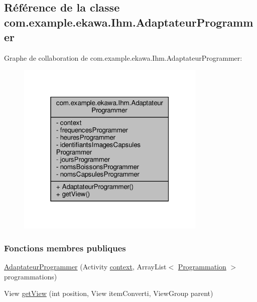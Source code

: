 \hypertarget{classcom_1_1example_1_1ekawa_1_1_ihm_1_1_adaptateur_programmer}{}\subsection{Référence de la classe com.\+example.\+ekawa.\+Ihm.\+Adaptateur\+Programmer}
\label{classcom_1_1example_1_1ekawa_1_1_ihm_1_1_adaptateur_programmer}


Graphe de collaboration de com.\+example.\+ekawa.\+Ihm.\+Adaptateur\+Programmer\+:\nopagebreak
\begin{figure}[H]
\begin{center}
\leavevmode
\includegraphics[width=256pt]{classcom_1_1example_1_1ekawa_1_1_ihm_1_1_adaptateur_programmer__coll__graph}
\end{center}
\end{figure}
\subsubsection*{Fonctions membres publiques}
\begin{DoxyCompactItemize}
\item 
\hyperlink{classcom_1_1example_1_1ekawa_1_1_ihm_1_1_adaptateur_programmer_a8a6bb79a26e790339065f37777890a34}{Adaptateur\+Programmer} (Activity \hyperlink{classcom_1_1example_1_1ekawa_1_1_ihm_1_1_adaptateur_programmer_aa2573f7d985ef662075730cb36a80f8a}{context}, Array\+List$<$ \hyperlink{classcom_1_1example_1_1ekawa_1_1_programmation}{Programmation} $>$ programmations)
\item 
View \hyperlink{classcom_1_1example_1_1ekawa_1_1_ihm_1_1_adaptateur_programmer_a948e7fa6ac9d148823e9f9dd3fba2f64}{get\+View} (int position, View item\+Converti, View\+Group parent)
\end{DoxyCompactItemize}
